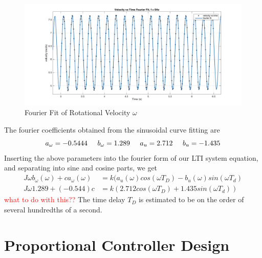 \documentclass[11pt,titlepage]{article}
\begin{document}
	\begin{figure}[H]
		\centering
		\includegraphics[scale=0.25]{fourier_vel_5Hz}
		\caption{Fourier Fit of Rotational Velocity $\omega$}
		\label{fig:fourier_vel_5Hz}
	\end{figure}
    \noindent The fourier coefficients obtained from the sinusoidal curve fitting are
	\begin{equation}
		a_{\omega}=-0.5444\hspace{0.5cm}b_{\omega}=1.289\hspace{0.5cm}a_u=2.712\hspace{0.5cm}b_u=-1.435\nonumber
	\end{equation}
	\noindent Inserting the above parameters into the fourier form of our LTI system equation, and separating into sine and cosine parts, we get
	\begin{align}
		J\omega b_{\omega}(\omega)+ca_{\omega}(\omega)&=k(a_u(\omega)cos(\omega T_D)-b_u(\omega)sin(\omega T_d)\\
		J\omega 1.289+(-0.544)c&=k(2.712cos(\omega T_D)+1.435sin(\omega T_d))
	\end{align}
	\textcolor{red}{what to do with this??}
	The time delay $T_D$ is estimated to be on the order of several hundredths of a second. 
\section{Proportional Controller Design}
\end{document}
